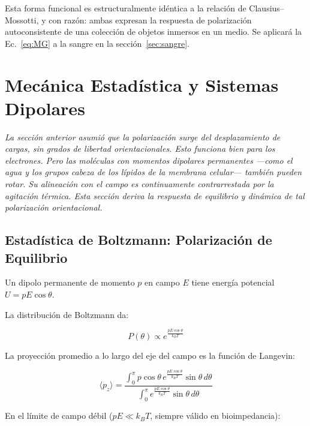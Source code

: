 \documentclass[12pt]{article}
\begin{document}
Esta forma funcional es estructuralmente id\'entica a la relaci\'on de Clausius--Mossotti,
y con raz\'on: ambas expresan la respuesta de polarizaci\'on autoconsistente de una colecci\'on
de objetos inmersos en un medio. Se aplicar\'a la Ec.~\eqref{eq:MG} a la sangre en la
secci\'on~\ref{sec:sangre}.


\section{Mec\'anica Estad\'istica y Sistemas Dipolares}

\label{sec:stat}


\noindent\textit{La secci\'on anterior asumi\'o que la polarizaci\'on surge del desplazamiento de
cargas, sin grados de libertad orientacionales. Esto funciona bien para los electrones. Pero las
mol\'eculas con momentos dipolares permanentes ---como el agua y los grupos cabeza de los
l\'ipidos de la membrana celular--- tambi\'en pueden rotar. Su alineaci\'on con el campo es
continuamente contrarrestada por la agitaci\'on t\'ermica. Esta secci\'on deriva la respuesta de
equilibrio y din\'amica de tal polarizaci\'on orientacional.}
\subsection{Estad\'istica de Boltzmann: Polarizaci\'on de Equilibrio}

Un dipolo permanente de momento $p$ en campo $E$ tiene energ\'ia potencial $U = pE\cos\theta$.

La distribuci\'on de Boltzmann da:

\begin{equation}
P(\theta) \propto e^{\frac{pE\cos\theta}{k_BT}}
\end{equation}

La proyecci\'on promedio a lo largo del eje del campo es la funci\'on de Langevin:

\begin{equation}
\langle p_z\rangle =
\frac{\displaystyle\int_0^\pi p\cos\theta\,
e^{\frac{pE\cos\theta}{k_BT}}\sin\theta\,d\theta}
{\displaystyle\int_0^\pi
e^{\frac{pE\cos\theta}{k_BT}}\sin\theta\,d\theta}
\end{equation}

En el l\'imite de campo d\'ebil ($pE \ll k_BT$, siempre v\'alido en bioimpedancia):
\end{document}
